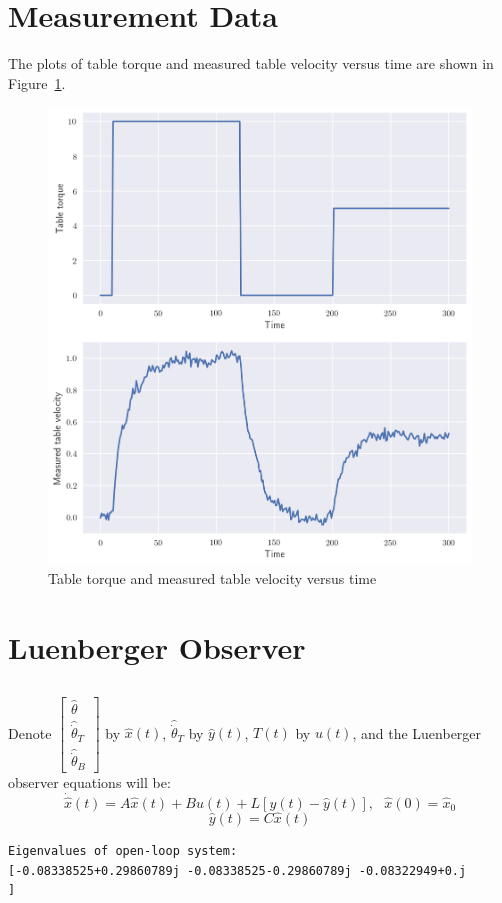 \documentclass[12pt]{article}
\begin{document}
\section{Measurement Data}

The plots of table torque and measured table velocity versus time are shown in Figure~\ref{fig:3}.
\begin{figure}[H]
	\centering
	\includegraphics[width=\linewidth]{3.png}      
	\caption{Table torque and measured table velocity versus time}
	\label{fig:3}
\end{figure}
\section{Luenberger Observer}
\subsection{}
Denote $\left[
\begin{array}{c}
\hat\theta\\
\hat{\dot\theta}_T\\
\hat{\dot\theta}_B
\end{array}
\right]$ by $\hat x(t)$, $\hat{\dot\theta}_T$ by $\hat y(t)$, $T(t)$ by $u(t)$, and the Luenberger observer equations will be:
\begin{equation}\label{eq:luen1}
\dot{\hat x}(t)=A\hat x(t)+Bu(t)+L[y(t)-\hat y(t)],\ \ \ \hat x(0)=\hat{x}_0
\end{equation}
\begin{equation}\label{eq:luen2}
\hat y(t)=C\hat x(t)
\end{equation}

\begin{Verbatim}
Eigenvalues of open-loop system: 
[-0.08338525+0.29860789j -0.08338525-0.29860789j -0.08322949+0.j        ]
\end{Verbatim}
\end{document}
